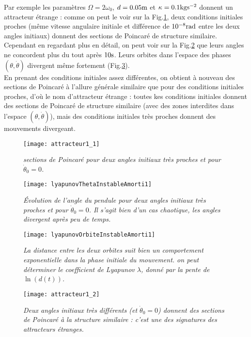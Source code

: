 \documentclass[a4paper,12pt,oneside]{article}
\def \t {\theta}
\def \vt {\Dot{\theta}}
\begin{document}
Par exemple les paramètres $\Omega=2\omega_0$, $d=0.05\rm{m}$ et $\kappa=0.1\rm{kgs^{-2}}$ donnent un attracteur étrange : comme on peut le voir sur la Fig.\ref{attracteur1_1}, deux conditions initiales proches (même vitesse angulaire initiale et différence de $10^{-8}\rm{rad}$ entre les deux angles initiaux) donnent des sections de Poincaré de structure similaire. Cependant en regardant plus en détail, on peut voir sur la Fig.\ref{lyapunovThetaInstableAmorti1} que leurs angles ne concordent plus du tout après $10\rm{s}$. Leurs orbites dans l'espace des phases $(\t,\vt)$ divergent même fortement (Fig.\ref{lyapunovOrbiteInstableAmorti1}).\\
En prenant des conditions initiales assez différentes, on obtient à nouveau des sections de Poincaré à l'allure générale similaire que pour des conditions initiales proches, d'où le nom d'attracteur étrange : toutes kes conditions initiales donnent des sections de Poincaré de structure similaire (avec des zones interdites dans l'espace $(\t,\vt)$), mais des conditions initiales très proches donnent des mouvements divergeant.

\begin{figure}[H]
    \centerline{\texttt{[image: attracteur1\_1]}}
\caption{ \label{attracteur1_1}\em
 sections de Poincaré pour deux angles initiaux très proches et pour $\vt_0=0$.
}
\end{figure}
\begin{figure}[H]
    \centerline{\texttt{[image: lyapunovThetaInstableAmorti1]}}
\caption{ \label{lyapunovThetaInstableAmorti1}\em
 Évolution de l'angle du pendule pour deux angles initiaux très proches et pour $\vt_0=0$. Il s'agit bien d'un cas chaotique, les angles divergent après peu de temps.
}
\end{figure}
\begin{figure}[H]
    \centerline{\texttt{[image: lyapunovOrbiteInstableAmorti1]}}
\caption{ \label{lyapunovOrbiteInstableAmorti1}\em
 La distance entre les deux orbites suit bien un comportement exponentielle dans la phase initiale du mouvement. on peut déterminer le coefficient de Lyapunov $\lambda$, donné par la pente de $\ln{(d(t))}$.
}
\end{figure}
\begin{figure}[H]
    \centerline{\texttt{[image: attracteur1\_2]}}
\caption{ \label{attracteur1_2}\em
 Deux angles initiaux très différents (et $\vt_0=0$) donnent des sections de Poincaré à la structure similaire : c'est une des signatures des attracteurs étranges.
}
\end{figure}
\end{document}
